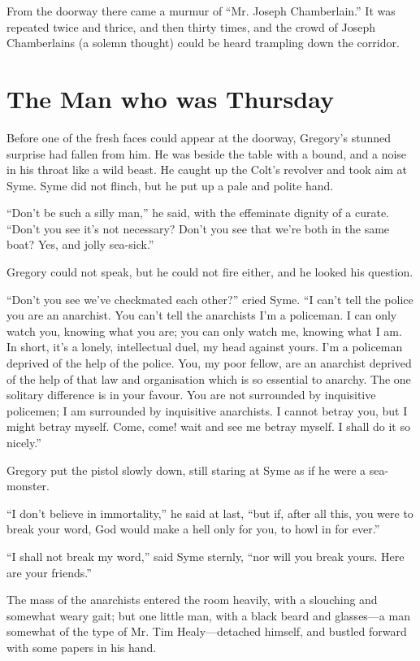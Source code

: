 \documentclass{book}
\begin{document}
From the doorway there came a murmur of “Mr. Joseph Chamberlain.” It was repeated twice and thrice, and then thirty times, and the crowd of Joseph Chamberlains (a solemn thought) could be heard trampling down the corridor.

\chapter{The Man who was Thursday}
\label{chapter-2}
Before one of the fresh faces could appear at the doorway, Gregory’s stunned surprise had fallen from him. He was beside the table with a bound, and a noise in his throat like a wild beast. He caught up the Colt’s revolver and took aim at Syme. Syme did not flinch, but he put up a pale and polite hand.

“Don’t be such a silly man,” he said, with the effeminate dignity of a curate. “Don’t you see it’s not necessary? Don’t you see that we’re both in the same boat? Yes, and jolly sea-sick.”

Gregory could not speak, but he could not fire either, and he looked his question.

“Don’t you see we’ve checkmated each other?” cried Syme. “I can’t tell the police you are an anarchist. You can’t tell the anarchists I’m a policeman. I can only watch you, knowing what you are; you can only watch me, knowing what I am. In short, it’s a lonely, intellectual duel, my head against yours. I’m a policeman deprived of the help of the police. You, my poor fellow, are an anarchist deprived of the help of that law and organisation which is so essential to anarchy. The one solitary difference is in your favour. You are not surrounded by inquisitive policemen; I am surrounded by inquisitive anarchists. I cannot betray you, but I might betray myself. Come, come! wait and see me betray myself. I shall do it so nicely.”

Gregory put the pistol slowly down, still staring at Syme as if he were a sea-monster.

“I don’t believe in immortality,” he said at last, “but if, after all this, you were to break your word, God would make a hell only for you, to howl in for ever.”

“I shall not break my word,” said Syme sternly, “nor will you break yours. Here are your friends.”

The mass of the anarchists entered the room heavily, with a slouching and somewhat weary gait; but one little man, with a black beard and glasses—a man somewhat of the type of Mr. Tim Healy—detached himself, and bustled forward with some papers in his hand.
\end{document}
